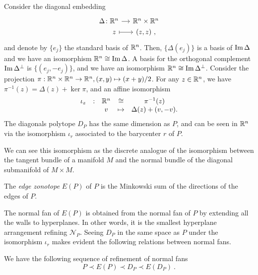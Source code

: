 Consider the diagonal embedding
\[
\begin{tikzcd}[row sep=0, column sep=small]
	\Delta \colon \R^n \arrow{r} & \R^n \times \R^n \\
	\phantom{\Delta \colon} z \arrow[r, |->] & (z,z) \ ,
\end{tikzcd}
\]
and denote by $\{e_j\}$ the standard basis of $\mathbb{R}^n$.
Then, $\{\Delta (e_j)\}$ is a basis of $\operatorname{\mathrm{Im}} \Delta$ and we have an isomorphism $\mathbb{R}^n \cong \operatorname{\mathrm{Im}} \Delta$.
A basis for the orthogonal complement $\operatorname{\mathrm{Im}} \Delta^{\bot}$ is $\{(e_j,-e_j)\}$, and we have an isomorphism $\mathbb{R}^n \cong \operatorname{\mathrm{Im}} \Delta^{\bot}$.
Consider the projection $\pi : \mathbb{R}^n \times \mathbb{R}^n \to \mathbb{R}^n, (x,y) \mapsto (x+y)/2$.
For any $z \in \mathbb{R}^n$, we have $\pi^{-1}(z)=\Delta(z)+\ker \pi$, and an affine isomorphism
\begin{equation} \label{eq:D_P-iso}
	\begin{matrix}
		\iota_z & : & \mathbb{R}^n & \cong & \pi^{-1}(z) \\
		& & v & \mapsto & \Delta(z)+(v,-v).
	\end{matrix}
\end{equation}
The diagonals polytope $D_P$ has the same dimension as $P$, and can be seen in $\mathbb{R}^n$ via the isomorphism $\iota_r$ associated to the barycenter $r$ of $P$.

\begin{remark}
	We can see this isomorphism as the discrete analogue of the isomorphism between the tangent bundle of a manifold $M$ and the normal bundle of the diagonal submanifold of $M\times M$.
\end{remark}

\begin{definition}
	\label{d:edgezonotope}
	The \emph{edge zonotope} $E(P)$ of $P$ is the Minkowski sum of the directions of the edges of $P$.
\end{definition}

The normal fan of $E(P)$ is obtained from the normal fan of $P$ by extending all the walls to hyperplanes.
In other words, it is the smallest hyperplane arrangement refining $\mathcal{N}_P$.
Seeing $D_P$ in the same space as $P$ under the isomorphism $\iota_r$ makes evident the following relations between normal fans.

\begin{lemma}
	We have the following sequence of refinement of normal fans
	\[
		P \prec E(P) \prec D_P \prec E(D_P) \ .
	\]
\end{lemma}

